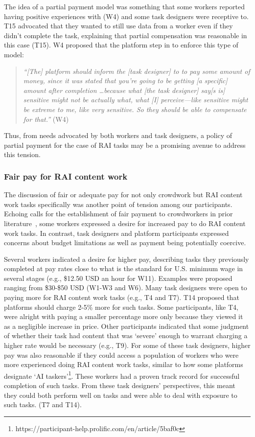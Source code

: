 The idea of a partial payment model was something that some workers reported having positive experiences with (W4) and some task designers were receptive to. T15 advocated that they wanted to still use data from a worker even if they didn't complete the task, explaining that partial compensation was reasonable in this case (T15). W4 proposed that the platform step in to enforce this type of model:
\begin{quote}
    \textit{``[The] platform should inform the [task designer] to to pay some amount of money, since it was stated that you're going to be getting [a specific] amount after completion \dots  because what [the task designer] say[s is] sensitive might not be actually what, what [I] perceive---like sensitive might be extreme to me, like very sensitive. So they should be able to compensate for that.''} (W4)
\end{quote}
Thus, from needs advocated by both workers and task designers, a policy of partial payment for the case of RAI tasks may be a promising avenue to address this tension. 

\subsubsection{Fair pay for RAI content work}
The discussion of fair or adequate pay for not only crowdwork but RAI content work tasks specifically was another point of tension among our participants. Echoing calls for the establishment of fair payment to crowdworkers in prior literature~\cite{silberman2018responsible, irani2013turkopticon}, some workers expressed a desire for increased pay to do RAI content work tasks. In contrast, task designers and platform participants expressed concerns about budget limitations as well as payment being potentially coercive. 

Several workers indicated a desire for higher pay, describing tasks they previously completed at pay rates close to what is the standard for U.S. minimum wage in several stages (e.g., \$12.50 USD an hour for W11). Examples were proposed ranging from \$30-\$50 USD (W1-W3 and W6). Many task designers were open to paying more for RAI content work tasks (e.g., T4 and T7). T14 proposed that platforms should charge 2-5\% more for such tasks. Some participants, like T4, were alright with paying a smaller percentage more only because they viewed it as a negligible increase in price. Other participants indicated that some judgment of whether their task had content that was `severe' enough to warrant charging a higher rate would be necessary (e.g., T9). For some of these task designers, higher pay was also reasonable if they could access a population of workers who were more experienced doing RAI content work tasks, similar to how some platforms designate `AI taskers'\footnote{https://participant-help.prolific.com/en/article/5baf0c}. These workers had a proven track record for successful completion of such tasks. From these task designers' perspectives, this meant they could both perform well on tasks and were able to deal with exposure to such tasks. (T7 and T14). 

